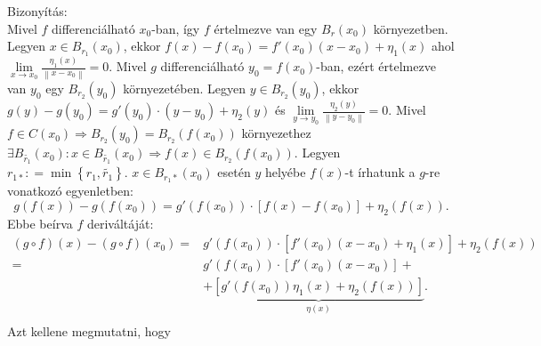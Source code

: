 \documentclass[12pt,a4paper]{scrartcl}
\newenvironment{bizonyitas}{}{}
\begin{document}
\begin{bizonyitas}
Bizonyítás:\\
Mivel \(f\) differenciálható \(x_{0}\)-ban, így \(f\) értelmezve van egy
\(B_{r}\left( x_{0} \right)\) környezetben. Legyen
\(x \in B_{r_{1}}\left( x_{0} \right)\), ekkor
\(f\left( x \right) - f\left( x_{0} \right) = f'\left( x_{0} \right)\left( {x - x_{0}} \right) + \eta_{1}\left( x \right)\)
ahol
\(\underset{x\rightarrow x_{0}}{\lim}\frac{\eta_{1}\left( x \right)}{\left\| {x - x_{0}} \right\|} = 0\).
Mivel \(g\) differenciálható \(y_{0} = f\left( x_{0} \right)\)-ban,
ezért értelmezve van \(y_{0}\) egy \(B_{r_{2}}\left( y_{0} \right)\)
környezetében. Legyen \(y \in B_{r_{2}}\left( y_{0} \right)\), ekkor
\(g\left( y \right) - g\left( y_{0} \right) = g'\left( y_{0} \right) \cdot \left( {y - y_{0}} \right) + \eta_{2}\left( y \right)\)
és
\(\underset{y\rightarrow y_{0}}{\lim}\frac{\eta_{2}\left( y \right)}{\left\| {y - y_{0}} \right\|} = 0\).
Mivel
\(\left. f \in C\left( x_{0} \right)\Rightarrow B_{r_{2}}\left( y_{0} \right) = B_{r_{2}}\left( {f\left( x_{0} \right)} \right) \right.\)
környezethez
\(\left. \exists B_{\widetilde{r_{1}}}\left( x_{0} \right):x \in B_{\widetilde{r_{1}}}\left( x_{0} \right)\Rightarrow f\left( x \right) \in B_{r_{2}}\left( {f\left( x_{0} \right)} \right) \right.\).
Legyen \(r_{1*}: = \min\left\{ {r_{1},\widetilde{r_{1}}} \right\}\).
\(x \in B_{r_{1}*}\left( x_{0} \right)\) esetén \(y\) helyébe
\(f\left( x \right)\)-t írhatunk a \(g\)-re vonatkozó egyenletben:
\[g\left( {f\left( x \right)} \right) - g\left( {f\left( x_{0} \right)} \right) = g'\left( {f\left( x_{0} \right)} \right) \cdot \left\lbrack {f\left( x \right) - f\left( x_{0} \right)} \right\rbrack + \eta_{2}{\left( {f\left( x \right)} \right).}\]
Ebbe beírva \(f\) deriváltáját: \[\begin{aligned}
  \left( {g \circ f} \right)\left( x \right) - \left( {g \circ f} \right)\left( {{x_0}} \right) =  & g'\left( {f\left( {{x_0}} \right)} \right) \cdot \left[ {f'\left( {{x_0}} \right)\left( {x - {x_0}} \right) + {\eta _1}\left( x \right)} \right] + {\eta _2}\left( {f\left( x \right)} \right) \\ 
   =  & g'\left( {f\left( {{x_0}} \right)} \right) \cdot \left[ {f'\left( {{x_0}} \right)\left( {x - {x_0}} \right)} \right] +  \\ 
   &  + \underbrace {\left[ {g'\left( {f\left( {{x_0}} \right)} \right){\eta _1}\left( x \right) + {\eta _2}\left( {f\left( x \right)} \right)} \right]}_{\eta \left( x \right)}. \\ 
\end{aligned} \] Azt kellene megmutatni, hogy

\end{bizonyitas}
\end{document}
